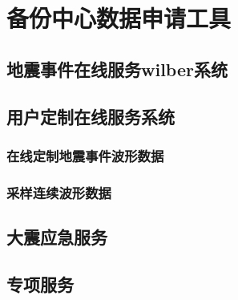 \section{备份中心数据申请工具}
\subsection{地震事件在线服务wilber系统}
\subsection{用户定制在线服务系统}
\subsubsection{在线定制地震事件波形数据}
\subsubsection{采样连续波形数据}
\subsection{大震应急服务}
\subsection{专项服务}
